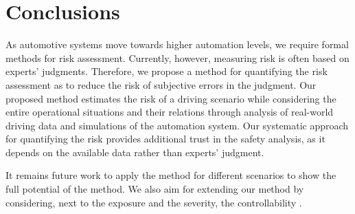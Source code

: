 \section{Conclusions}
\label{sec:conclusions}

As automotive systems move towards higher automation levels, we require formal methods for risk assessment. Currently, however, measuring risk is often based on experts' judgments. Therefore, we propose a method for quantifying the risk assessment as to reduce the risk of subjective errors in the judgment. Our proposed method estimates the risk of a driving scenario while considering the entire operational situations and their relations through analysis of real-world driving data and simulations of the automation system. Our systematic approach for quantifying the risk provides additional trust in the safety analysis, as it depends on the available data rather than experts' judgment.

It remains future work to apply the method for different scenarios to show the full potential of the method. We also aim for extending our method by considering, next to the exposure and the severity, the controllability \cite{monkhouse2015notion}.

